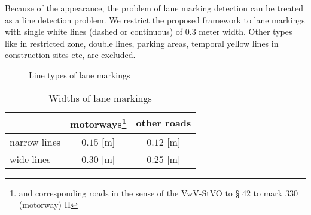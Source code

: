 Because of the appearance, the problem of lane marking detection can be treated as a line detection problem. We restrict the proposed framework to lane markings with single white lines (dashed or continuous) of 0.3 meter width. Other types like in restricted zone, double lines, parking areas, temporal yellow lines in construction sites etc, are excluded.%


\begin{figure}
	\centering
	\quad
	\newline
	\quad
	\quad
	\caption{\small Line types of lane markings \cite{RMS1}}
	\label{fig:LaneMarkingTypes}
\end{figure}

\begin{table} [h!]
	\centering
	\begin{tabular}{l|cc}
		\toprule
		& motorways\footnote{\label{motorway}and corresponding roads in the sense of the VwV-StVO to § 42 to mark 330 (motorway) II} & other roads\\
		\midrule
		narrow lines & $0.15$ [m] & $0.12$ [m] \\
		wide lines   & $0.30$ [m] & $0.25$ [m] \\
		\bottomrule
	\end{tabular}
	\caption{\small Widths of lane markings \cite{RMS1}}
	\label{tab:LaneMarkingWidths}
	
\end{table}

